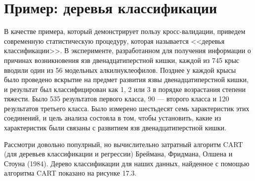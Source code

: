 \section{Пример: деревья классификации}
В качестве примера, который демонстрирует пользу кросс-валидации, приведем современную статистическую процедуру, которая называется <<деревья классификации>>. В эксперименте, разработанном для получения информации о причинах возникновения язв двенадцатиперстной кишки, каждой из 745 крыс вводили один из 56 модельных алкилнуклеофилов. Позднее у каждой крысы было проведено вскрытие на предмет развития язвы двенадцатиперстной кишки, и результат был классифицирован как 1, 2 или 3 в порядке возрастания степени тяжести. Было 535 результатов первого класса, 90 --- второго класса и 120 результатов третьего класса. Было измерено шестьдесят семь характеристик этих соединений, и цель анализа состояла в том, чтобы установить, какие из характеристик были связаны с развитием язв двенадцатиперстной кишки.
\begin{figure}[h]
\end{figure}

Рассмотри довольно популрный, но вычислительно затратный алгоритм CART (для деревьев классификации и регрессии) Бреймана, Фридмана, Олшена и Стоуна (1984). Дерево классификации для наших данных, найденное с помощью алгоритма CART показано на рисунке 17.3.

